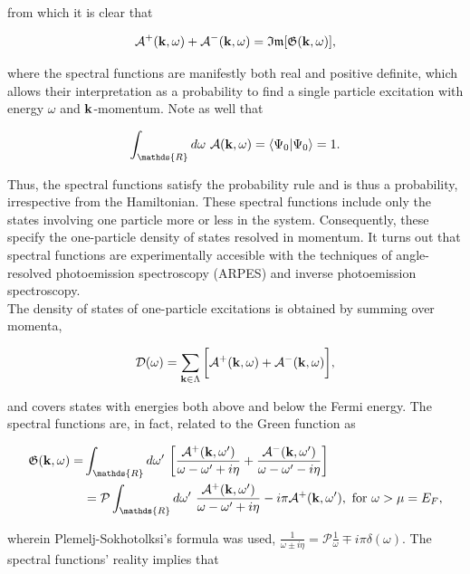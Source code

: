 \documentclass{homework}
\begin{document}
from which it is clear that 

$$
    \mathcal{A}^{+}({\bf k}, \omega) + \mathcal{A}^{-}({\bf k}, \omega) = \mathfrak{I}\mathfrak{m}[\mathfrak{G}({\bf k}, \omega)],
$$ 

where the spectral functions are manifestly both real and positive definite, which allows their interpretation as a probability to find a single particle excitation with energy $\omega$ and ${\bf k}$-momentum. Note as well that 

$$
    \int_{\mathds{R}} d\omega \blanky \mathcal{A}({\bf k}, \omega) = \bra{\Psi_0}\ket{\Psi_0} = 1.
$$

Thus, the spectral functions satisfy the probability rule and is thus a probability, irrespective from the Hamiltonian. These spectral functions include only the states involving one particle more or less in the system. Consequently, these specify the one-particle density of states resolved in momentum. It turns out that spectral functions are experimentally accesible with the techniques of angle-resolved photoemission spectroscopy (ARPES) and inverse photoemission spectroscopy. \\

The density of states of one-particle excitations is obtained by summing over momenta,

\begin{equation}
    \mathcal{D}(\omega) = \sum_{{\bf k} \in \Lambda} \bigg[\mathcal{A}^{+}({\bf k}, \omega) + \mathcal{A}^{-}({\bf k}, \omega) \bigg],
\end{equation}

and covers states with energies both above and below the Fermi energy. The spectral functions are, in fact, related to the Green function as 

\begin{equation}
\begin{split}
    \mathfrak{G}({\bf k}, \omega) =& \int_{\mathds{R}} d\omega' \blanky \bigg[ \frac{\mathcal{A}^{+}({\bf k}, \omega')}{\omega - \omega' + i\eta} + \frac{\mathcal{A}^{-}({\bf k}, \omega')}{\omega - \omega' - i\eta} \bigg] \\
    &= \mathcal{P} \int_{\mathds{R}} d\omega' \blanky  \frac{\mathcal{A}^{+}({\bf k}, \omega')}{\omega - \omega' + i\eta} - i\pi \mathcal{A}^{+}({\bf k}, \omega'), \textnormal{ for } \omega > \mu = E_F,
\end{split} 
\end{equation}
 
wherein Plemelj-Sokhotolksi's formula was used, $\frac{1}{\omega \pm i \eta} = \mathcal{P} \frac{1}{\omega} \mp i \pi \delta(\omega)$. The spectral functions' reality implies that 
\end{document}
